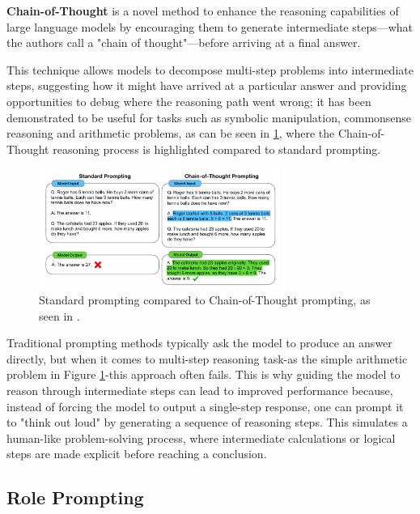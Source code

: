 \textbf{Chain-of-Thought} is a novel method to enhance the reasoning capabilities of large language models by encouraging them to generate intermediate steps—what the authors call a "chain of thought"—before arriving at a final answer. \cite{wei2023chainofthought}

This technique allows models to decompose multi-step problems into intermediate steps, suggesting how it might have arrived at a particular answer and providing opportunities to debug where the reasoning path went wrong; it has been demonstrated to be useful for tasks such as symbolic manipulation, commonsense reasoning and arithmetic problems, as can be seen in \ref{fig:cot-prompting}, where the Chain-of-Thought reasoning process is highlighted compared to standard prompting.

\begin{figure}[h]
    \centering
    \includegraphics[width=0.7\textwidth]{images/cot-prompting.png}
    \caption{Standard prompting compared to Chain-of-Thought prompting, as seen in \cite{wei2023chainofthought}.}
    \label{fig:cot-prompting}
\end{figure}

Traditional prompting methods typically ask the model to produce an answer directly, but when it comes to multi-step reasoning task-as the simple arithmetic problem in Figure \ref{fig:cot-prompting}-this approach often fails. This is why guiding the model to reason through intermediate steps can lead to improved performance because, instead of forcing the model to output a single-step response, one can prompt it to "think out loud" by generating a sequence of reasoning steps. This simulates a human-like problem-solving process, where intermediate calculations or logical steps are made explicit before reaching a conclusion.


\subsection{Role Prompting}
\label{sec:role-prompting}

